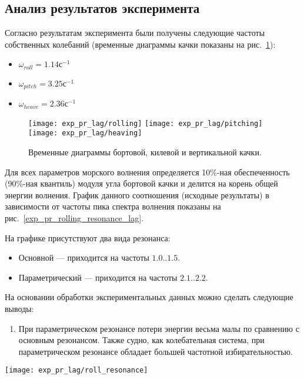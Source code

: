 \subsection{Анализ результатов эксперимента}

Согласно результатам эксперимента были получены следующие частоты собственных колебаний (временные диаграммы качки показаны на рис.~\ref{exp_pr_rolling_lag}):
\begin{itemize}
	\item	$ \omega_{roll} = 1.14 \text{с}^{-1}$
	\item	$ \omega_{pitch} = 3.25 \text{с}^{-1}$
	\item	$ \omega_{heave} = 2.36 \text{с}^{-1}$
\end{itemize}

\begin{figure}[ht]
	\begin{center}
	\texttt{[image: exp\_pr\_lag/rolling]}
	\texttt{[image: exp\_pr\_lag/pitching]}
	\texttt{[image: exp\_pr\_lag/heaving]}
	\end{center}
	\caption{Временные диаграммы бортовой, килевой и вертикальной качки.}
	\label{exp_pr_rolling_lag}
\end{figure}

Для всех параметров морского волнения определяется 10\%-ная обеспеченность (90\%-ная квантиль) модуля угла бортовой качки и делится на корень общей энергии волнения. График данного соотношения (исходные результаты) в зависимости от частоты пика спектра волнения показаны на рис.~\ref{exp_pr_rolling_resonance_lag}.

На графике присутствуют два вида резонанса:
\begin{itemize}
	\item	Основной --- приходится на частоты $1.0..1.5$.
	\item	Параметрический --- приходится на частоты $2.1..2.2$.
\end{itemize}


На основании обработки экспериментальных данных можно сделать следующие выводы:
\begin{enumerate}
	\item	При параметрическом резонансе потери энергии весьма малы по сравнению с основным резонансом. 
			Также судно, как колебательная система, при параметрическом резонансе обладает большей частотной избирательностью.
\end{enumerate}


\begin{sidewaysfigure}
	\begin{center}
	\texttt{[image: exp\_pr\_lag/roll\_resonance]}
	\end{center}
	\caption{Основной и параметрический резонанс бортовой качки.}
	\label{exp_pr_rolling_resonance_lag}
\end{sidewaysfigure}

